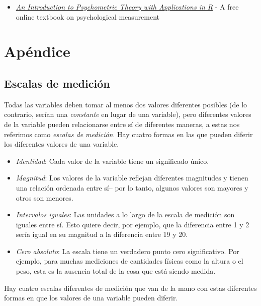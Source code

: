 \documentclass[
  12pt,
]{book}
\providecommand{\tightlist}{%
  \setlength{\itemsep}{0pt}\setlength{\parskip}{0pt}}
\theoremstyle{definition}
\theoremstyle{definition}
\theoremstyle{definition}
\theoremstyle{remark}
\begin{document}
\begin{itemize}
\tightlist
\item
  \href{http://www.personality-project.org/r/book/}{\emph{An Introduction to Psychometric Theory with Applications in R}} - A free online textbook on psychological measurement
\end{itemize}

\hypertarget{apuxe9ndice}{%
\section{Apéndice}\label{apuxe9ndice}}

\hypertarget{escalas-de-mediciuxf3n}{%
\subsection{Escalas de medición}\label{escalas-de-mediciuxf3n}}

Todas las variables deben tomar al menos dos valores diferentes posibles (de lo contrario, serían una \emph{constante} en lugar de una variable), pero diferentes valores de la variable pueden relacionarse entre sí de diferentes maneras, a estas nos referimos como \emph{escalas de medición}. Hay cuatro formas en las que pueden diferir los diferentes valores de una variable.

\begin{itemize}
\tightlist
\item
  \emph{Identidad}: Cada valor de la variable tiene un significado único.
\item
  \emph{Magnitud}: Los valores de la variable reflejan diferentes magnitudes y tienen una relación ordenada entre sí-- por lo tanto, algunos valores son mayores y otros son menores.
\item
  \emph{Intervalos iguales}: Las unidades a lo largo de la escala de medición son iguales entre sí. Esto quiere decir, por ejemplo, que la diferencia entre 1 y 2 sería igual en su magnitud a la diferencia entre 19 y 20.
\item
  \emph{Cero absoluto}: La escala tiene un verdadero punto cero significativo. Por ejemplo, para muchas mediciones de cantidades físicas como la altura o el peso, esta es la ausencia total de la cosa que está siendo medida.
\end{itemize}

Hay cuatro escalas diferentes de medición que van de la mano con estas diferentes formas en que los valores de una variable pueden diferir.
\end{document}

